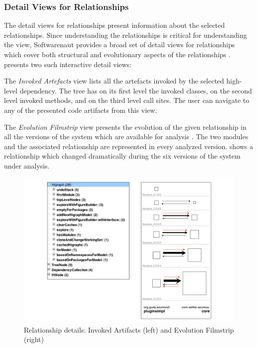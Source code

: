 \documentclass[preprint,12pt]{elsarticle}
\begin{document}
\subsubsection {Detail Views for Relationships}

The detail views for relationships present information about the selected relationships. Since understanding the relationships is critical for understanding the view, Softwarenaut provides a broad set of detail views for relationships which cover both structural and evolutionary aspects of the relationships \cite{lungu-cutedge, lungu-relevo}.  presents two such interactive detail views: 

\begin{description}
\item The {\em Invoked Artefacts} view lists all the artefacts invoked by the selected high-level dependency. The tree has on its first level the invoked classes, on the second level invoked methods, and on the third level call sites. The user can navigate to any of the presented code artifacts from this view.
\item The {\em Evolution Filmstrip} view presents the evolution of the given relationship in all the versions of the system which are available for analysis \cite{lungu-relevo}. The two modules and the associated relationship are represented in every analyzed version.  shows a relationship which changed dramatically during the six versions of the system under analysis. 
\end{description}

\begin{figure}[t]
\begin{center}
\includegraphics[width=0.8\linewidth]{DetailsForEdge}
\caption{Relationship details: Invoked Artifacts (left) and Evolution Filmstrip (right)}
\end{center}
\end{figure}
\end{document}
